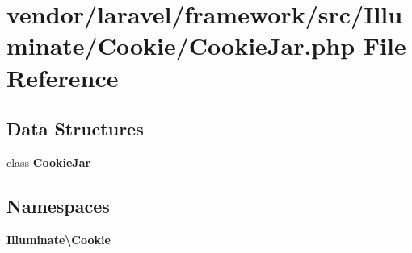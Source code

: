 \section{vendor/laravel/framework/src/\+Illuminate/\+Cookie/\+Cookie\+Jar.php File Reference}
\label{_cookie_jar_8php}
\subsection*{Data Structures}
\begin{DoxyCompactItemize}
\item 
class {\bf Cookie\+Jar}
\end{DoxyCompactItemize}
\subsection*{Namespaces}
\begin{DoxyCompactItemize}
\item 
 {\bf Illuminate\textbackslash{}\+Cookie}
\end{DoxyCompactItemize}
